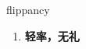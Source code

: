 
\begin{frame}
{\huge flippancy}
\begin{center}
\begin{enumerate}\Large
  \item \textbf{轻率，无礼}
\end{enumerate}
\end{center}
\end{frame}
